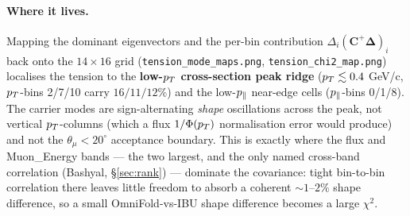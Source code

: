 \paragraph{Where it lives.}
Mapping the dominant eigenvectors and the per-bin contribution
$\Delta_{i}(\mathbf{C}^{+}\boldsymbol{\Delta})_{i}$ back onto the
$14\times16$ grid (\texttt{tension\_mode\_maps.png},
\texttt{tension\_chi2\_map.png}) localises the tension to the
\textbf{low-$p_{T}$ cross-section peak ridge} ($p_{T}\lesssim0.4$ GeV/c,
$p_{T}$-bins 2/7/10 carry $16/11/12\%$) and the low-$p_{\parallel}$ near-edge
cells ($p_{\parallel}$-bins 0/1/8). The carrier modes are sign-alternating
\emph{shape} oscillations across the peak, not vertical $p_{T}$-columns
(which a flux $1/\Phi(p_{T})$ normalisation error would produce) and not
the $\theta_{\mu}<20^{\circ}$ acceptance boundary. This is exactly where
the flux and Muon\_Energy bands --- the two largest, and the only named
cross-band correlation (Bashyal, \S\ref{sec:rank}) --- dominate the
covariance: tight bin-to-bin correlation there leaves little freedom to
absorb a coherent $\sim1$--$2\%$ shape difference, so a small
OmniFold-vs-IBU shape difference becomes a large $\chi^{2}$.

